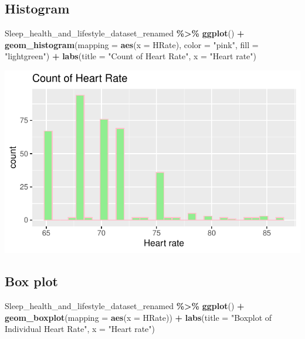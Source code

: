 \documentclass[
  11pt,
]{article}
\newenvironment{Shaded}{\begin{snugshade}}{\end{snugshade}}
\newcommand{\AttributeTok}[1]{\textcolor[rgb]{0.13,0.29,0.53}{#1}}
\newcommand{\FunctionTok}[1]{\textcolor[rgb]{0.13,0.29,0.53}{\textbf{#1}}}
\newcommand{\NormalTok}[1]{#1}
\newcommand{\SpecialCharTok}[1]{\textcolor[rgb]{0.81,0.36,0.00}{\textbf{#1}}}
\newcommand{\StringTok}[1]{\textcolor[rgb]{0.31,0.60,0.02}{#1}}
\begin{document}
\hypertarget{histogram}{%
\subsection{Histogram}\label{histogram}}

\begin{Shaded}
\begin{Highlighting}[]
\NormalTok{Sleep\_health\_and\_lifestyle\_dataset\_renamed }\SpecialCharTok{\%\textgreater{}\%}
  \FunctionTok{ggplot}\NormalTok{() }\SpecialCharTok{+}
    \FunctionTok{geom\_histogram}\NormalTok{(}\AttributeTok{mapping =} \FunctionTok{aes}\NormalTok{(}\AttributeTok{x =}\NormalTok{ HRate), }\AttributeTok{color =} \StringTok{"pink"}\NormalTok{, }\AttributeTok{fill =} \StringTok{"lightgreen"}\NormalTok{) }\SpecialCharTok{+}
    \FunctionTok{labs}\NormalTok{(}\AttributeTok{title =} \StringTok{"Count of Heart Rate"}\NormalTok{, }\AttributeTok{x =} \StringTok{"Heart rate"}\NormalTok{) }
\end{Highlighting}
\end{Shaded}

\begin{center}\includegraphics[width=0.7\linewidth]{SleepHelath_files/figure-latex/unnamed-chunk-40-1} \end{center}

\hypertarget{box-plot}{%
\subsection{Box plot}\label{box-plot}}

\begin{Shaded}
\begin{Highlighting}[]
\NormalTok{Sleep\_health\_and\_lifestyle\_dataset\_renamed }\SpecialCharTok{\%\textgreater{}\%}
  \FunctionTok{ggplot}\NormalTok{() }\SpecialCharTok{+}
    \FunctionTok{geom\_boxplot}\NormalTok{(}\AttributeTok{mapping =} \FunctionTok{aes}\NormalTok{(}\AttributeTok{x =}\NormalTok{ HRate)) }\SpecialCharTok{+}
    \FunctionTok{labs}\NormalTok{(}\AttributeTok{title =} \StringTok{"Boxplot of Individual Heart Rate"}\NormalTok{, }\AttributeTok{x =} \StringTok{"Heart rate"}\NormalTok{)}
\end{Highlighting}
\end{Shaded}
\end{document}

